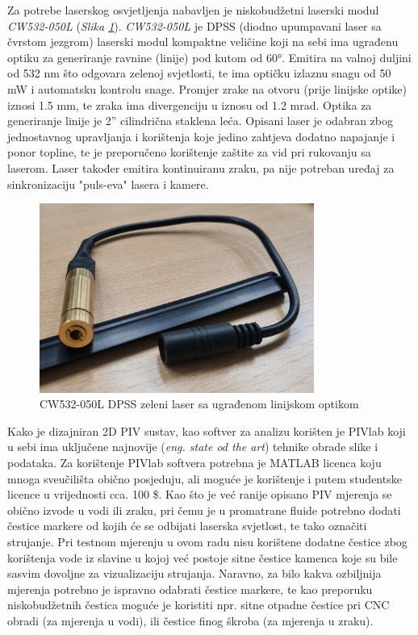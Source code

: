 \par
Za potrebe laserskog osvjetljenja nabavljen je niskobudžetni laserski modul \textit{CW532-050L} (\textit{Slika \ref{sl:7.2}}). \textit{CW532-050L} je DPSS (diodno upumpavani laser sa čvrstom jezgrom) laserski modul kompaktne veličine koji na sebi ima ugrađenu optiku za generiranje ravnine (linije) pod kutom od 60°. Emitira na valnoj duljini od 532 nm što odgovara zelenoj svjetlosti, te ima optičku izlaznu snagu od 50 mW i automatsku kontrolu snage. Promjer zrake na otvoru (prije linijske optike) iznosi 1.5 mm, te zraka ima divergenciju u iznosu od 1.2 mrad. Optika za generiranje linije je 2'' cilindrična staklena leća. Opisani laser je odabran zbog jednostavnog upravljanja i korištenja koje jedino zahtjeva dodatno napajanje i ponor topline, te je preporučeno korištenje zaštite za vid pri rukovanju sa laserom. Laser također emitira kontinuiranu zraku, pa nije potreban uređaj za sinkronizaciju "puls-eva" lasera i kamere.
\begin{figure}[h]  
	\centering
	\includegraphics[width=9cm]{./7_LowCostPIV/slika7_2.jpg} 
	\caption{CW532-050L DPSS zeleni laser sa ugrađenom linijskom optikom}
	\label{sl:7.2}
\end{figure}
\par
Kako je dizajniran 2D PIV sustav, kao softver za analizu korišten je PIVlab koji u sebi ima uključene najnovije (\textit{eng. state od the art}) tehnike obrade slike i podataka. Za korištenje PIVlab softvera potrebna je MATLAB licenca koju mnoga sveučilišta obično posjeduju, ali moguće je korištenje i putem studentske licence u vrijednosti cca. 100 \$. Kao što je već ranije opisano PIV mjerenja se obično izvode u vodi ili zraku, pri čemu je u promatrane fluide potrebno dodati čestice markere od kojih će se odbijati laserska svjetlost, te tako označiti strujanje. Pri testnom mjerenju u ovom radu nisu korištene dodatne čestice zbog korištenja vode iz slavine u kojoj već postoje sitne čestice kamenca koje su bile sasvim dovoljne za vizualizaciju strujanja. Naravno, za bilo kakva ozbiljnija mjerenja potrebno je ispravno odabrati čestice markere, te kao preporuku niskobudžetnih čestica moguće je koristiti npr. sitne otpadne čestice pri CNC obradi (za mjerenja u vodi), ili čestice finog škroba (za mjerenja u zraku).
